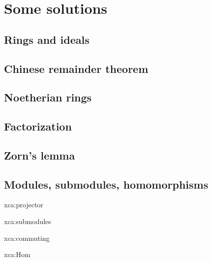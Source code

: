 \chapter{Some solutions}

\section*{Rings and ideals}
\section*{Chinese remainder theorem}
\section*{Noetherian rings}
\section*{Factorization}
\section*{Zorn's lemma}


\section*{Modules, submodules, homomorphisms}

\begin{sol}{xca:projector}
\end{sol}

\begin{sol}{xca:submodules}
\end{sol}

\begin{sol}{xca:commuting}
\end{sol}

\begin{sol}{xca:Hom}
\end{sol}